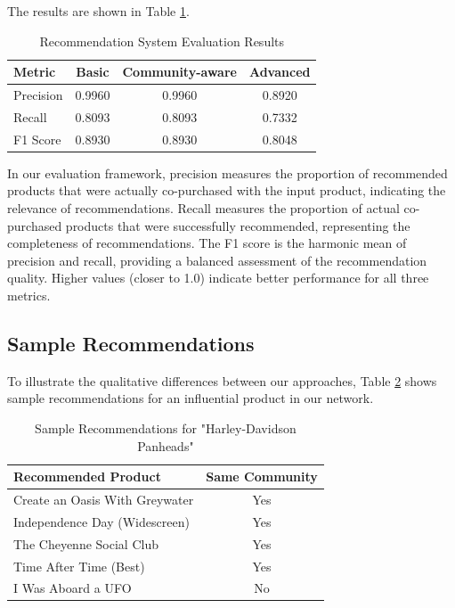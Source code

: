 \documentclass[conference]{IEEEtran}
\begin{document}
The results are shown in Table \ref{tab:recommendation-results}.

\begin{table}[ht]
\centering
\caption{Recommendation System Evaluation Results}
\label{tab:recommendation-results}
\begin{tabular}{lccc}
\toprule
\textbf{Metric} & \textbf{Basic} & \textbf{Community-aware} & \textbf{Advanced} \\
\midrule
Precision & 0.9960 & 0.9960 & 0.8920 \\
Recall & 0.8093 & 0.8093 & 0.7332 \\
F1 Score & 0.8930 & 0.8930 & 0.8048 \\
\bottomrule
\end{tabular}
\end{table}

In our evaluation framework, precision measures the proportion of recommended products that were actually co-purchased with the input product, indicating the relevance of recommendations. Recall measures the proportion of actual co-purchased products that were successfully recommended, representing the completeness of recommendations. The F1 score is the harmonic mean of precision and recall, providing a balanced assessment of the recommendation quality. Higher values (closer to 1.0) indicate better performance for all three metrics.

\subsection{Sample Recommendations}
To illustrate the qualitative differences between our approaches, Table \ref{tab:sample-recommendations} shows sample recommendations for an influential product in our network.

\begin{table}[ht]
\centering
\caption{Sample Recommendations for "Harley-Davidson Panheads"}
\label{tab:sample-recommendations}
\begin{tabular}{p{5.5cm}c}
\toprule
\textbf{Recommended Product} & \textbf{Same Community} \\
\midrule
Create an Oasis With Greywater & Yes \\
Independence Day (Widescreen) & Yes \\
The Cheyenne Social Club & Yes \\
Time After Time (Best) & Yes \\
I Was Aboard a UFO & No \\
\bottomrule
\end{tabular}
\end{table}
\end{document}
